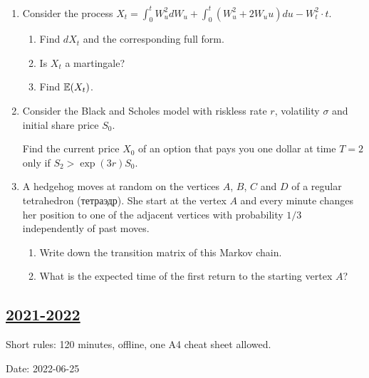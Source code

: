 \begin{enumerate}
\item Consider the process $X_t = \int_0^t W_u^2 dW_u + \int_0^t (W_u^2 + 2W_u u ) du - W_t^2 \cdot t$.

\begin{enumerate}
    \item Find $dX_t$ and the corresponding full form. 
    \item Is $X_t$ a martingale?
    \item Find $\operatorname{\mathbb{E}}(X_t)$.
\end{enumerate}


\item Consider the Black and Scholes model with riskless rate $r$, volatility $\sigma$ and initial share price $S_0$. 

Find the current price $X_0$ of an option that pays you one dollar at time $T=2$ only if $S_2 > \exp(3r) S_0$.

\item A hedgehog moves at random on the vertices $A$, $B$, $C$ and $D$ of a regular tetrahedron (тетраэдр).
She start at the vertex $A$ and every minute changes her position to one of the adjacent vertices with probability $1/3$
independently of past moves. 

\begin{enumerate}
    \item Write down the transition matrix of this Markov chain. 
    \item What is the expected time of the first return to the starting vertex $A$?
\end{enumerate}

\end{enumerate}






\subsection[2021-2022]{\hyperref[sec:sol_kr_04_2021_2022]{2021-2022}}
\label{sec:kr_04_2021_2022} %

Short rules: 120 minutes, offline, one A4 cheat sheet allowed.

Date: 2022-06-25

